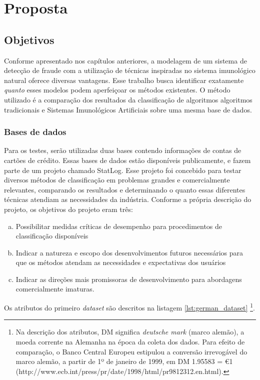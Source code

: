 \chapter{Proposta}

\section{Objetivos}

Conforme apresentado nos capítulos anteriores, a modelagem de um sistema de detecção de fraude com a utilização de técnicas inspiradas no sistema imunológico natural oferece diversas vantagens. Esse trabalho busca identificar exatamente \emph{quanto} esses modelos podem aperfeiçoar os métodos existentes. O método utilizado é a comparação dos resultados da classificação de algoritmos algoritmos tradicionais e Sistemas Imunológicos Artificiais sobre uma mesma base de dados.

\subsection{Bases de dados}

Para os testes, serão utilizadas duas bases contendo informações de contas de cartões de crédito. Essas bases de dados estão disponíveis publicamente, e fazem parte de um projeto chamado StatLog. Esse projeto foi concebido para testar diversos métodos de classificação em problemas grandes e comercialmente relevantes, comparando os resultados e determinando o quanto essas diferentes técnicas atendiam as necessidades da indústria. Conforme a própria descrição do projeto, os objetivos do projeto eram três:

\begin{enumerate}[a)]
    \item Possibilitar medidas críticas de desempenho para procedimentos de classificação disponíveis
    \item Indicar a natureza e escopo dos desenvolvimentos futuros necessários para que os métodos atendam as necessidades e expectativas dos usuários
    \item Indicar as direções mais promissoras de desenvolvimento para abordagens comercialmente imaturas.
\end{enumerate}

Os atributos do primeiro \emph{dataset} são descritos na listagem \ref{lst:german_dataset} \footnote{Na descrição dos atributos, DM significa \emph{deutsche mark} (marco alemão), a moeda corrente na Alemanha na época da coleta dos dados. Para efeito de comparação, o Banco Central Europeu estipulou a conversão irrevogável do marco alemão, a partir de 1º de janeiro de 1999, em DM 1.95583 = \euro 1 (http://www.ecb.int/press/pr/date/1998/html/pr981231\textunderscore{}2.en.html).}.

